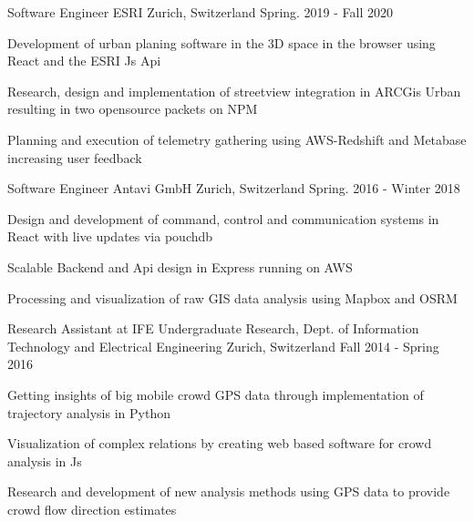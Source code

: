 

\begin{cventries}

  \cventry
    {Software Engineer} %
    {ESRI} %
    {Zurich, Switzerland} %
    {Spring. 2019 - Fall 2020} %
    {
      \begin{cvitems} %
        \item {Development of urban planing software in the 3D space in the browser using React and the ESRI Js Api}
        \item {Research, design and implementation of streetview integration in ARCGis Urban resulting in two opensource packets on NPM}
        \item {Planning and execution of telemetry gathering using AWS-Redshift and Metabase increasing user feedback}
      \end{cvitems}
    }

  \cventry
    {Software Engineer} %
    {Antavi GmbH} %
    {Zurich, Switzerland} %
    {Spring. 2016 - Winter 2018} %
    {
      \begin{cvitems} %
        \item {Design and development of command, control and communication systems in React with live updates via pouchdb}
        \item {Scalable Backend and Api design in Express running on AWS}
        \item {Processing and visualization of raw GIS data analysis using Mapbox and OSRM}
      \end{cvitems}
    }

  \cventry
    {Research Assistant at IFE} %
    {Undergraduate Research, Dept. of Information Technology and Electrical Engineering} %
    {Zurich, Switzerland} %
    {Fall 2014 - Spring 2016} %
    {
      \begin{cvitems} %
        \item {Getting insights of big mobile crowd GPS data through implementation of trajectory analysis in Python}
        \item {Visualization of complex relations by creating web based software for crowd analysis in Js}
        \item {Research and development of new analysis methods using GPS data to provide crowd flow direction estimates}
      \end{cvitems}
    }


\end{cventries}

